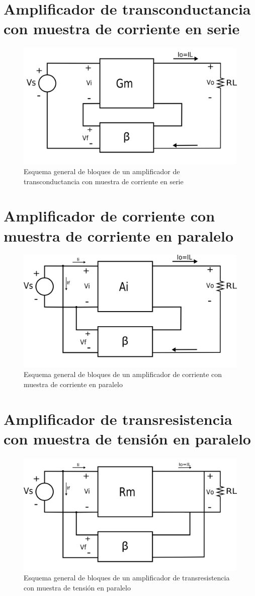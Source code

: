 \section{Amplificador de transconductancia con muestra de corriente en serie}

\begin{figure}[h!]
	\includegraphics[width=0.8\linewidth]{./img/2.png}
	\centering
	\caption{Esquema general de bloques de un amplificador de transconductancia con muestra de corriente en serie}
	\label{fig:amp2}
\end{figure}

\newpage
\section{Amplificador de corriente con muestra de corriente en paralelo}

\begin{figure}[h!]
	\includegraphics[width=0.8\linewidth]{./img/3.png}
	\centering
	\caption{Esquema general de bloques de un amplificador de corriente con muestra de corriente en paralelo}
	\label{fig:amp3}
\end{figure}

\section{Amplificador de transresistencia con muestra de tensión en paralelo}

\begin{figure}[h!]
	\includegraphics[width=0.8\linewidth]{./img/4.png}
	\centering
	\caption{Esquema general de bloques de un amplificador de transresistencia con muestra de tensión en paralelo}
	\label{fig:amp4}
\end{figure}



